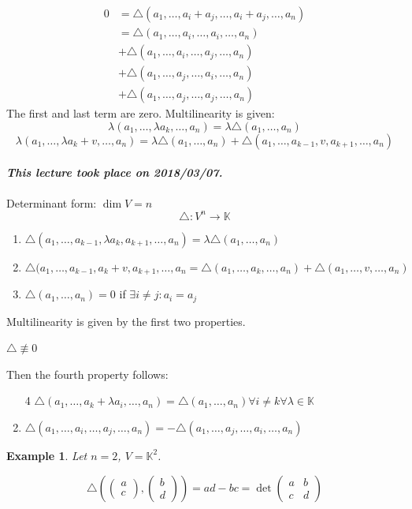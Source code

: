 \documentclass{article}
\newtheorem{example}{Example}  \numberwithin{example}{section}
\newcommand{\dateref}[1]{\paragraph{\textit{This lecture took place on #1.}}}
\newcommand{\vectwo}[2]{\begin{pmatrix} #1 \\ #2 \end{pmatrix}}
\begin{document}
\begin{align*}
  0 &= \triangle(a_1, \dots, a_i + a_j, \dots, a_i + a_j, \dots, a_n) \\
    &= \triangle(a_1, \dots, a_i, \dots, a_i, \dots, a_n) \\
    &+ \triangle(a_1, \dots, a_i, \dots, a_j, \dots, a_n) \\
    &+ \triangle(a_1, \dots, a_j, \dots, a_i, \dots, a_n) \\
    &+ \triangle(a_1, \dots, a_j, \dots, a_j, \dots, a_n)
\end{align*}
The first and last term are zero. Multilinearity is given:
\[ \lambda(a_1, \dots, \lambda a_k, \dots, a_n) = \lambda \triangle (a_1, \dots, a_n) \]
\[ \lambda(a_1, \dots, \lambda a_k + v, \dots, a_n) = \lambda \triangle (a_1, \dots, a_n) + \triangle (a_1, \dots, a_{k-1}, v, a_{k+1}, \dots, a_n) \]

\dateref{2018/03/07}

Determinant form: $\dim{V} = n$
\[ \triangle: V^n \to \mathbb K \]

\begin{enumerate}
  \item $\triangle(a_1, \dots, a_{k-1}, \lambda a_k, a_{k+1}, \ldots, a_n) = \lambda \triangle(a_1, \dots, a_n)$
  \item $\triangle(a_1, \dots, a_{k-1}, a_k + v, a_{k+1}, \dots, a_n = \triangle(a_1, \dots, a_k, \dots, a_n) + \triangle(a_1, \dots, v, \dots, a_n)$
  \item $\triangle(a_1, \dots, a_n) = 0$ if $\exists i \neq j: a_i = a_j$
\end{enumerate}
Multilinearity is given by the first two properties.

$\triangle \not\equiv 0$

Then the fourth property follows:
\begin{enumerate}
  \item[4] $\triangle(a_1, \dots, a_{k} + \lambda a_i, \dots, a_n) = \triangle(a_1, \dots, a_n) \forall i \neq k \forall \lambda \in \mathbb K$
  \item $\triangle(a_1, \dots, a_i, \dots, a_j, \dots, a_n) = -\triangle(a_1, \dots, a_j, \dots, a_i, \dots, a_n)$
\end{enumerate}

\begin{example}
  Let $n=2$, $V = \mathbb K^2$.

  \[ \triangle \left(\vectwo ac, \vectwo bd\right) = ad - bc = \det\begin{pmatrix} a & b \\ c & d \end{pmatrix} \]
\end{example}
\end{document}
